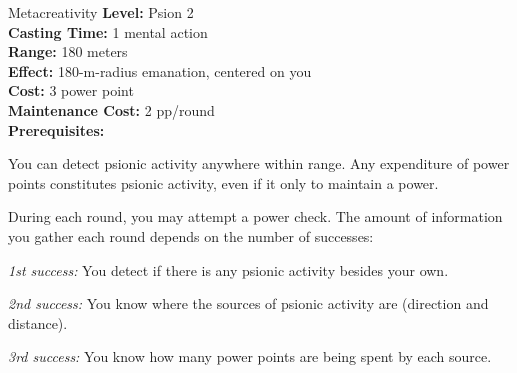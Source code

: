 {Metacreativity}
{
	\textbf{Level:}
	Psion 2\\
	\textbf{Casting Time:}
	1 mental action\\
	\textbf{Range:}
	180 meters\\
	\textbf{Effect:}
	180-m-radius emanation, centered on you\\
	\textbf{Cost:}
	3 power point\\
	\textbf{Maintenance Cost:}
	2 pp/round\\
	\textbf{Prerequisites:}
	\\
}
{
	You can detect psionic activity anywhere within range. Any expenditure of power points constitutes psionic activity, even if it only to maintain a power.

	During each round, you may attempt a power check. The amount of information you gather each round depends on the number of successes:

	\textit{1st success:} You detect if there is any psionic activity besides your own.

	\textit{2nd success:} You know where the sources of psionic activity are (direction and distance).

	\textit{3rd success:} You know how many power points are being spent by each source.
}